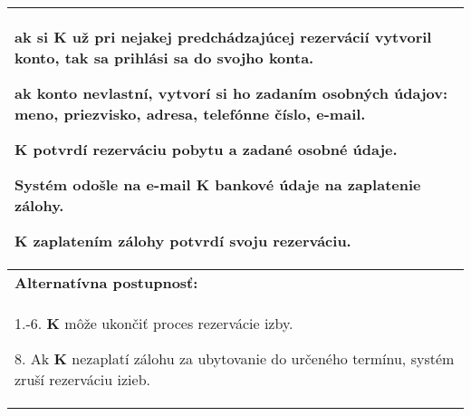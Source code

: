\begin{center}
\begin{tabularx}{\textwidth}{| X |}
\begin{compactenum}
\begin{compactenum}
      \item ak si \textbf{K} už pri nejakej predchádzajúcej rezervácií vytvoril konto, tak sa prihlási sa do svojho konta.
      \item ak konto nevlastní, vytvorí si ho zadaním osobných údajov: meno, priezvisko, adresa, telefónne číslo, e-mail.
      \end{compactenum}
    \item \textbf{K} potvrdí rezerváciu pobytu a zadané osobné údaje.
    \item Systém odošle na e-mail \textbf{K} bankové údaje na zaplatenie zálohy.
    \item \textbf{K} zaplatením zálohy potvrdí svoju rezerváciu. 
  \end{compactenum}\\
  \hline
  \textbf{Alternatívna postupnosť:} \\
  \begin{compactenum}
    \item[1.-6.] \textbf{K} môže ukončiť proces rezervácie izby.
    \item[8.] Ak \textbf{K} nezaplatí zálohu za ubytovanie do určeného termínu, systém zruší rezerváciu izieb.
  \end{compactenum}\\
  \hline
\end{tabularx}
\end{center}
